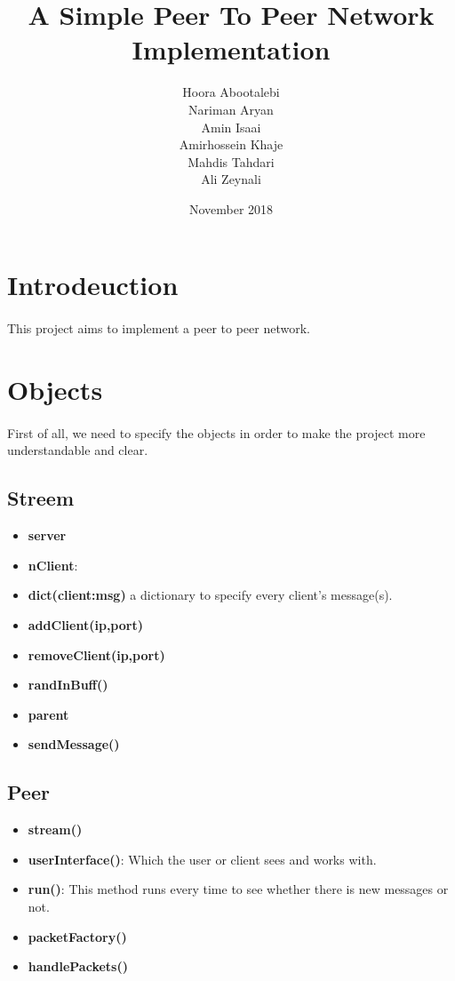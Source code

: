 \documentclass{article}
\title{A Simple Peer To Peer Network Implementation}
\author{Hoora Abootalebi\\Nariman Aryan\\Amin Isaai\\Amirhossein Khaje\\Mahdis Tahdari\\Ali Zeynali}
\date{ November 2018}
\begin{document}
\large
\maketitle
\clearpage
\tableofcontents
\clearpage
\section{Introdeuction}
\paragraph{}This project aims to implement a peer to peer network.
\section{Objects}
\paragraph{}First of all, we need to specify the objects in order to make the project more understandable and clear.
\subsection{Streem}
\begin{itemize}
    \item \textbf{server}
    \item \textbf{nClient}:
    \item \textbf{dict(client:msg)} a dictionary to specify every client's message(s). 
    \item \textbf{addClient(ip,port)}
    \item \textbf{removeClient(ip,port)}
    \item \textbf{randInBuff()}
    \item \textbf{parent}
    \item \textbf{sendMessage()}
\end{itemize}
\subsection{Peer}
\begin{itemize}
    \item \textbf{stream()}
    \item \textbf{userInterface()}: Which the user or client sees and works with. 
    \item \textbf{run()}: This method runs every time to see whether there is new messages or not.
    \item \textbf{packetFactory()}
    \item \textbf{handlePackets()}
\end{itemize}
\end{document}

